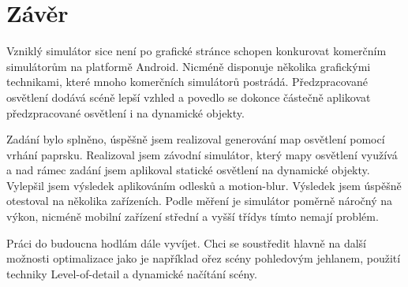 \documentclass[11pt,twoside,a4paper]{book}
\begin{document}
\chapter{Závěr}
Vzniklý simulátor sice není po grafické stránce schopen konkurovat komerčním simulátorům na platformě Android. Nicméně disponuje několika grafickými technikami, které mnoho komerčních simulátorů postrádá. Předzpracované osvětlení dodává scéně lepší vzhled a povedlo se dokonce částečně aplikovat předzpracované osvětlení i na dynamické objekty.

Zadání bylo splněno, úspěšně jsem realizoval generování map osvětlení pomocí vrhání paprsku. Realizoval jsem závodní simulátor, který mapy osvětlení využívá a nad rámec zadání jsem aplikoval statické osvětlení na dynamické objekty. Vylepšil jsem výsledek aplikováním odlesků a motion-blur. Výsledek jsem úspěšně otestoval na několika zařízeních. Podle měření je simulátor poměrně náročný na výkon, nicméně mobilní zařízení střední a vyšší třídy\linebreak s tímto nemají problém.

Práci do budoucna hodlám dále vyvíjet. Chci se soustředit hlavně na další možnosti optimalizace jako je například ořez scény pohledovým jehlanem, použití techniky Level-of-detail a dynamické načítání scény.


%

%
{
\raggedright

}

%

\appendix
\end{document}
